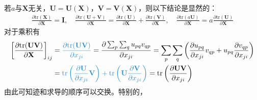 \documentclass{ctexart}
\newcommand{\blue}[1]{\textcolor{Solarized-blue}{#1}}
\theoremstyle{definition}
\def \Iv {\mathbf{I}}
\def \Uv {\mathbf{U}}
\def \Vv {\mathbf{V}}
\def \Xv {\mathbf{X}}
\def \tr {\mathrm{tr}}
\begin{document}
若$a$与$\Xv$无关，$\Uv = \Uv(\Xv)$，$\Vv = \Vv(\Xv)$，则以下结论是显然的：
\begin{align*}
    \frac{\partial \tr(\Xv)}{\partial \Xv} = \Iv, \quad \frac{\partial \tr(\Uv+\Vv)}{\partial \Xv} = \frac{\partial \tr(\Uv)}{\partial \Xv} + \frac{\partial \tr(\Vv)}{\partial \Xv}, \quad \frac{\partial \tr(a \Uv)}{\partial \Xv} = a \frac{\partial \tr(\Uv)}{\partial \Xv}
\end{align*}
对于乘积有
\begin{align*}
    \left[ \frac{\partial \tr(\Uv \Vv)}{\partial \Xv} \right]_{ij} & = \blue{\frac{\partial \tr(\Uv \Vv)}{\partial x_{ji}}} = \frac{\partial \sum_p \sum_q u_{pq} v_{qp}}{\partial x_{ji}} = \sum_p \sum_q \left( \frac{\partial u_{pq}}{\partial x_{ji}} v_{qp} + u_{pq} \frac{\partial v_{qp}}{\partial x_{ji}} \right) \\
                                                                   & = \blue{\tr \left( \frac{\partial \Uv}{\partial x_{ji}} \Vv \right) + \tr \left( \Uv \frac{\partial \Vv}{\partial x_{ji}} \right)} = \tr \left( \frac{\partial \Uv \Vv}{\partial x_{ji}} \right)
\end{align*}
由此可知\blue{迹和求导的顺序可以交换}。特别的，
\end{document}
